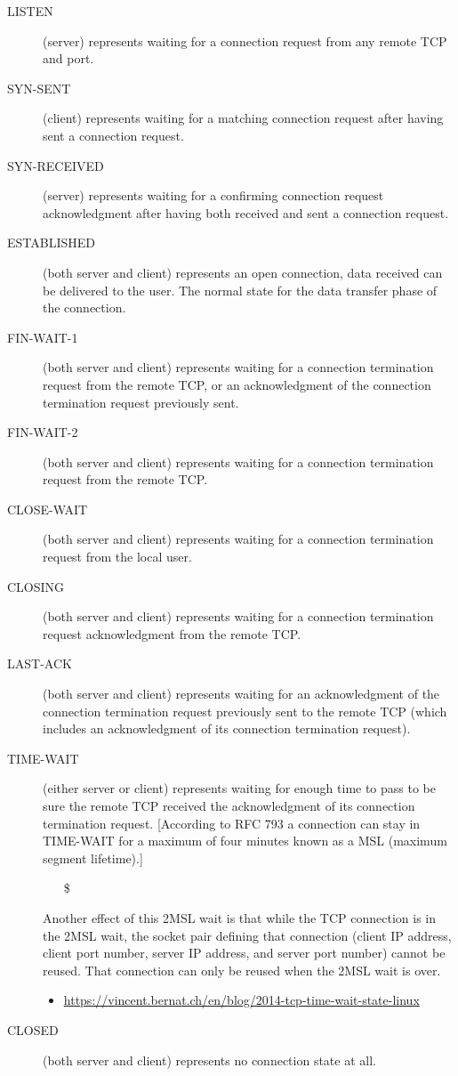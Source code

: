 \begin{description}
\item[LISTEN] (server) represents waiting for a connection request from any remote TCP and
  port.
\item[SYN-SENT] (client) represents waiting for a matching connection request after having
  sent a connection request.
\item[SYN-RECEIVED] (server) represents waiting for a confirming connection request
  acknowledgment after having both received and sent a connection request.
\item[ESTABLISHED] (both server and client) represents an open connection, data received
  can be delivered to the user. The normal state for the data transfer phase of the
  connection.
\item[FIN-WAIT-1] (both server and client) represents waiting for a connection termination
  request from the remote TCP, or an acknowledgment of the connection termination request
  previously sent.
\item[FIN-WAIT-2] (both server and client) represents waiting for a connection termination
  request from the remote TCP.
\item[CLOSE-WAIT] (both server and client) represents waiting for a connection termination
  request from the local user.
\item[CLOSING] (both server and client) represents waiting for a connection termination
  request acknowledgment from the remote TCP.
\item[LAST-ACK] (both server and client) represents waiting for an acknowledgment of the
  connection termination request previously sent to the remote TCP (which includes an
  acknowledgment of its connection termination request).
\item[TIME-WAIT] (either server or client) represents waiting for enough time to pass to
  be sure the remote TCP received the acknowledgment of its connection termination
  request. [According to RFC 793 a connection can stay in TIME-WAIT for a maximum of four
  minutes known as a MSL (maximum segment lifetime).]
  \begin{itemize}
  \item[\$] 
  \end{itemize}
  Another effect of this 2MSL wait is that while the TCP connection is in the 2MSL wait,
  the socket pair defining that connection (client IP address, client port number, server
  IP address, and server port number) cannot be reused. That connection can only be reused
  when the 2MSL wait is over.
  \begin{itemize}
  \item \href{Coping with the TCP TIME-WAIT state on busy Linux
      servers}{https://vincent.bernat.ch/en/blog/2014-tcp-time-wait-state-linux}
  \end{itemize}
\item[CLOSED] (both server and client) represents no connection state at all.
\end{description}

